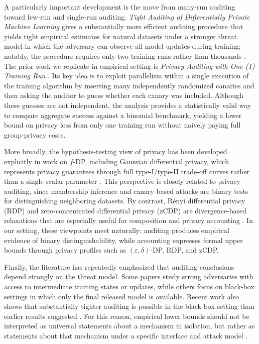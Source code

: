 \documentclass[10pt]{article}
\newcommand{\eps}{\varepsilon}
\begin{document}
A particularly important development is the move from many-run auditing toward few-run and single-run auditing. \emph{Tight Auditing of Differentially Private Machine Learning} gives a substantially more efficient auditing procedure that yields tight empirical estimates for natural datasets under a stronger threat model in which the adversary can observe all model updates during training; notably, the procedure requires only two training runs rather than thousands \cite{nasr2023tight}. The prior work we replicate in empirical setting is \emph{Privacy Auditing with One (1) Training Run} \cite{steinke2023privacy}. Its key idea is to exploit parallelism within a single execution of the training algorithm by inserting many independently randomized canaries and then asking the auditor to guess whether each canary was included. Although these guesses are not independent, the analysis provides a statistically valid way to compare aggregate success against a binomial benchmark, yielding a lower bound on privacy loss from only one training run without naively paying full group-privacy costs.

More broadly, the hypothesis-testing view of privacy has been developed explicitly in work on $f$-DP, including Gaussian differential privacy, which represents privacy guarantees through full type-I/type-II trade-off curves rather than a single scalar parameter \cite{dong2022gaussian}. This perspective is closely related to privacy auditing, since membership inference and canary-based attacks are binary tests for distinguishing neighboring datasets. By contrast, R\'enyi differential privacy (RDP) and zero-concentrated differential privacy (zCDP) are divergence-based relaxations that are especially useful for composition and privacy accounting \cite{mironov2017renyi,bun2016concentrated}. In our setting, these viewpoints meet naturally: auditing produces empirical evidence of binary distinguishability, while accounting expresses formal upper bounds through privacy profiles such as $(\eps,\delta)$-DP, RDP, and zCDP.

Finally, the literature has repeatedly emphasized that auditing conclusions depend strongly on the threat model. Some papers study strong adversaries with access to intermediate training states or updates, while others focus on black-box settings in which only the final released model is available. Recent work also shows that substantially tighter auditing is possible in the black-box setting than earlier results suggested \cite{annamalai2024nearlytight}. For this reason, empirical lower bounds should not be interpreted as universal statements about a mechanism in isolation, but rather as statements about that mechanism under a specific interface and attack model \cite{nasr2023tight,annamalai2024nearlytight}.
\end{document}
